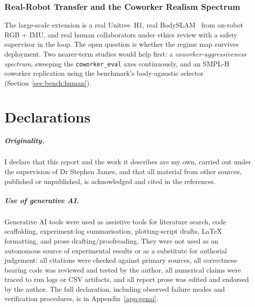 \documentclass[11pt,a4paper]{report}
\newcommand{\bodyslampp}{BodySLAM\nolinebreak[4]\hspace{-.05em}\raisebox{.2ex}{\scriptsize ++}}
\begin{document}
\subsection{Real-Robot Transfer and the Coworker Realism Spectrum}
\label{sec:fw:realbody}
\label{sec:fw:embodiment}

The large-scale extension is a real Unitree~H1, real
\bodyslampp{}~\cite{henning2023bodyslampp} from on-robot RGB + IMU,
and real human collaborators under ethics review with a safety
supervisor in the loop. The open question is whether the regime map
survives deployment. Two nearer-term studies would help first: a
\emph{coworker-aggressiveness spectrum}, sweeping the
\texttt{coworker\_eval} axes continuously, and an
SMPL-H~\cite{romero2017smplh} coworker replication using the
benchmark's body-agnostic selector (Section~\ref{sec:bench:human}).


\clearpage
\chapter*{Declarations}

\paragraph{Originality.}
I declare that this report and the work it describes are my own,
carried out under the supervision of Dr Stephen James, and that all
material from other sources, published or unpublished, is
acknowledged and cited in the references.

\paragraph{Use of generative AI.}
Generative AI tools were used as assistive tools for literature search,
code scaffolding, experiment-log summarisation, plotting-script drafts,
\LaTeX{} formatting, and prose drafting/proofreading. They were not
used as an autonomous source of experimental results or as a substitute
for authorial judgement: all citations were checked against primary
sources, all correctness-bearing code was reviewed and tested by the
author, all numerical claims were traced to run logs or CSV artifacts,
and all report prose was edited and endorsed by the author. The full
declaration, including observed failure modes and verification
procedures, is in Appendix~\ref{app:genai}.
\end{document}
